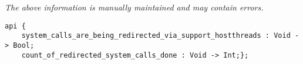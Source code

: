 \label{api:Redirect\_Slow\_Syscalls\_Via\_Support\_Hostthreads}

{\tiny \it The above information is manually maintained and may contain errors.}
\begin{verbatim}
api {
    system_calls_are_being_redirected_via_support_hostthreads : Void -> Bool;
    count_of_redirected_system_calls_done : Void -> Int;};
\end{verbatim}
